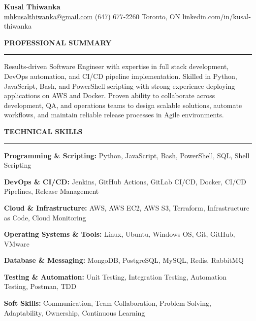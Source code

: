 \documentclass[10pt,letterpaper]{article}
\begin{document}
\begin{center}
{\LARGE\textbf{Kusal Thiwanka}}\\[3pt]
\href{mailto:mhkusalthiwanka@gmail.com}{mhkusalthiwanka@gmail.com}\hspace{2em}%
(647) 677{-}2260\hspace{2em}%
Toronto, ON\hspace{2em}
linkedin.com/in/kusal-thiwanka
\end{center}

\vspace{6pt}

\textbf{PROFESSIONAL SUMMARY}\\[-8pt]
\noindent\rule{\textwidth}{1pt}

\vspace{-2pt}

Results-driven Software Engineer with expertise in full stack development, DevOps automation, and CI/CD pipeline implementation. Skilled in Python, JavaScript, Bash, and PowerShell scripting with strong experience deploying applications on AWS and Docker. Proven ability to collaborate across development, QA, and operations teams to design scalable solutions, automate workflows, and maintain reliable release processes in Agile environments.

\vspace{8pt}

\textbf{TECHNICAL SKILLS}\\[-8pt]
\noindent\rule{\textwidth}{1pt}

\vspace{-2pt}

\textbf{Programming \& Scripting:} Python, JavaScript, Bash, PowerShell, SQL, Shell Scripting

\textbf{DevOps \& CI/CD:} Jenkins, GitHub Actions, GitLab CI/CD, Docker, CI/CD Pipelines, Release Management

\textbf{Cloud \& Infrastructure:} AWS, AWS EC2, AWS S3, Terraform, Infrastructure as Code, Cloud Monitoring

\textbf{Operating Systems \& Tools:} Linux, Ubuntu, Windows OS, Git, GitHub, VMware

\textbf{Database \& Messaging:} MongoDB, PostgreSQL, MySQL, Redis, RabbitMQ

\textbf{Testing \& Automation:} Unit Testing, Integration Testing, Automation Testing, Postman, TDD

\textbf{Soft Skills:} Communication, Team Collaboration, Problem Solving, Adaptability, Ownership, Continuous Learning
\end{document}

